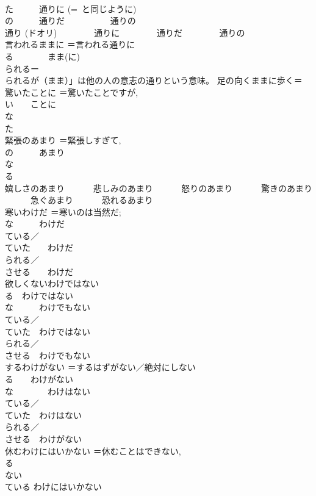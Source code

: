 \documentclass[8pt]{extreport}
\begin{document}
\begin{CJK}{UTF8}{min}
\\	た　　　通りに (=~と同じように) 
\\	の　　　通りだ 　　　　　通りの
\\	通り (ドオリ) 　　　　通りに 　　　　通りだ 　　　　通りの
\\	言われるままに	＝言われる通りに 
\\	る　　　　まま(に) 
\\	られるー
\\	られるが（まま）」は他の人の意志の通りという意味。 足の向くままに歩く＝
\\	驚いたことに	＝驚いたことですが, 
\\	い　　ことに 
\\	な　　 
\\	た
\\	緊張のあまり	＝緊張しすぎて, 
\\	の　　　あまり 
\\	な 
\\	る 
\\	嬉しさのあまり 　　　悲しみのあまり 　　　怒りのあまり 　　　驚きのあまり 　　　急ぐあまり 　　　恐れるあまり
\\	寒いわけだ	＝寒いのは当然だ; 
\\	な　　　わけだ 
\\	ている／
\\	ていた　　わけだ 
\\	られる／
\\	させる　　わけだ
\\	欲しくないわけではない	
\\	る　わけではない 
\\	な　　　わけでもない 
\\	ている／
\\	ていた　わけではない 
\\	られる／
\\	させる　わけでもない
\\	するわけがない	＝するはずがない／絶対にしない 
\\	る　　わけがない 
\\	な　　　　わけはない 
\\	ている／
\\	ていた　わけはない 
\\	られる／
\\	させる　わけがない
\\	休むわけにはいかない	＝休むことはできない, 
\\	る 
\\	ない 
\\	ている わけにはいかない 

\end{CJK}
\end{document}
